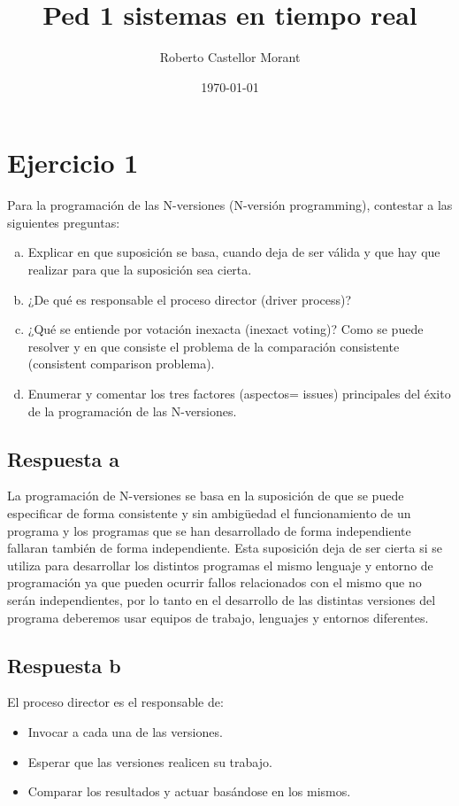 \documentclass[a4paper,10pt]{article}
\author{Roberto Castellor Morant}
\title{Ped 1 sistemas en tiempo real}
\date{\today}
\begin{document}
\maketitle

\section{Ejercicio 1}

Para la programación de las N-versiones (N-versión programming), contestar a las
siguientes preguntas:

\begin{enumerate}[a)]
	\item Explicar en que suposición se basa, cuando deja de ser válida y
		que hay que realizar para que la suposición sea cierta.
	\item ¿De qué es responsable el proceso director (driver process)?
	\item ¿Qué se entiende por votación inexacta (inexact voting)? Como se puede
	 resolver y en que consiste el problema de la comparación consistente
(consistent comparison problema).
	\item Enumerar y comentar los tres factores (aspectos= issues) principales del
éxito de la programación de las N-versiones.
\end{enumerate}

\subsection{Respuesta a}

La programación de N-versiones se basa en la suposición de que se puede
especificar de forma consistente y sin ambigüedad el funcionamiento de un
programa y los programas que se han desarrollado de forma independiente fallaran
también de forma independiente. Esta suposición deja de ser cierta si se utiliza
para desarrollar los distintos programas el mismo lenguaje y entorno de
programación ya que pueden ocurrir fallos relacionados con el mismo que no serán
independientes, por lo tanto en el desarrollo de las distintas versiones del
programa deberemos usar equipos de trabajo, lenguajes y entornos diferentes.

\subsection{Respuesta b}

El proceso director es el responsable de:
\begin{itemize}
	\item Invocar a cada una de las versiones.
	\item Esperar que las versiones realicen su trabajo.
	\item Comparar los resultados y actuar basándose en los mismos.
\end{itemize}
\end{document}

